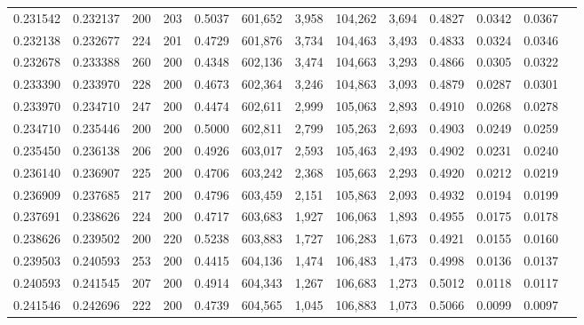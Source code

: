 \begin{tabular}{rrrrrrrrrrrrr}
0.231542 & 0.232137 &   200 & 203 &                                     0.5037 & 601,652 &   3,958 & 104,262 &   3,694 & 0.4827 & 0.0342 & 0.0367 \\
0.232138 & 0.232677 &   224 & 201 &                                     0.4729 & 601,876 &   3,734 & 104,463 &   3,493 & 0.4833 & 0.0324 & 0.0346 \\
0.232678 & 0.233388 &   260 & 200 &                                     0.4348 & 602,136 &   3,474 & 104,663 &   3,293 & 0.4866 & 0.0305 & 0.0322 \\
0.233390 & 0.233970 &   228 & 200 &                                     0.4673 & 602,364 &   3,246 & 104,863 &   3,093 & 0.4879 & 0.0287 & 0.0301 \\
0.233970 & 0.234710 &   247 & 200 &                                     0.4474 & 602,611 &   2,999 & 105,063 &   2,893 & 0.4910 & 0.0268 & 0.0278 \\
0.234710 & 0.235446 &   200 & 200 &                                     0.5000 & 602,811 &   2,799 & 105,263 &   2,693 & 0.4903 & 0.0249 & 0.0259 \\
0.235450 & 0.236138 &   206 & 200 &                                     0.4926 & 603,017 &   2,593 & 105,463 &   2,493 & 0.4902 & 0.0231 & 0.0240 \\
0.236140 & 0.236907 &   225 & 200 &                                     0.4706 & 603,242 &   2,368 & 105,663 &   2,293 & 0.4920 & 0.0212 & 0.0219 \\
0.236909 & 0.237685 &   217 & 200 &                                     0.4796 & 603,459 &   2,151 & 105,863 &   2,093 & 0.4932 & 0.0194 & 0.0199 \\
0.237691 & 0.238626 &   224 & 200 &                                     0.4717 & 603,683 &   1,927 & 106,063 &   1,893 & 0.4955 & 0.0175 & 0.0178 \\
0.238626 & 0.239502 &   200 & 220 &                                     0.5238 & 603,883 &   1,727 & 106,283 &   1,673 & 0.4921 & 0.0155 & 0.0160 \\
0.239503 & 0.240593 &   253 & 200 &                                     0.4415 & 604,136 &   1,474 & 106,483 &   1,473 & 0.4998 & 0.0136 & 0.0137 \\
0.240593 & 0.241545 &   207 & 200 &                                     0.4914 & 604,343 &   1,267 & 106,683 &   1,273 & 0.5012 & 0.0118 & 0.0117 \\
0.241546 & 0.242696 &   222 & 200 &                                     0.4739 & 604,565 &   1,045 & 106,883 &   1,073 & 0.5066 & 0.0099 & 0.0097 \\

\end{tabular}
